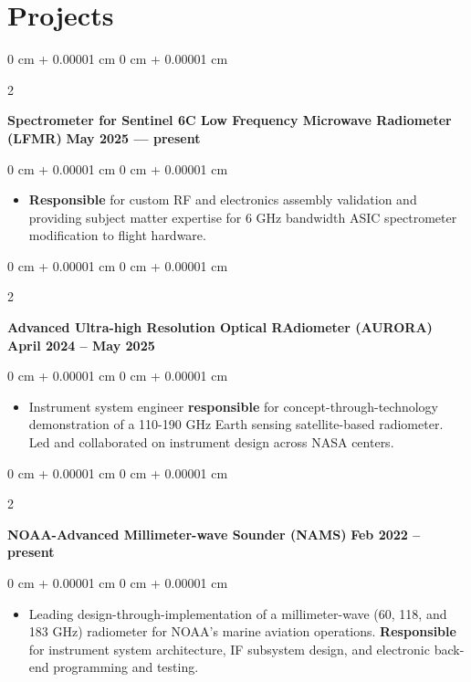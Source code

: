 \documentclass[10pt, letterpaper]{article}
\newenvironment{highlights}{
    \begin{itemize}[
        topsep=0.10 cm,
        parsep=0.10 cm,
        partopsep=0pt,
        itemsep=0pt,
        leftmargin=0 cm + 10pt     
    ]
}{
    \end{itemize}
} %
\newenvironment{onecolentry}{
    \begin{adjustwidth}{
        0 cm + 0.00001 cm
    }{
        0 cm + 0.00001 cm
    }
}{
    \end{adjustwidth}
} %
\newenvironment{twocolentry}[2][]{
    \onecolentry
    \def\secondColumn{#2}
    \setcolumnwidth{\fill, 4.5 cm}
    \begin{paracol}{2}
}{
    \switchcolumn \raggedleft \secondColumn
    \end{paracol}
    \endonecolentry
} %
\begin{document}
    \section{Projects}
       \justifying
        \begin{twocolentry}{
            \textbf{May 2025 --- present}
        }
            \textbf{Spectrometer for Sentinel 6C Low Frequency Microwave Radiometer (LFMR)}\end{twocolentry}

        \vspace{0.20 cm}
        \begin{onecolentry}
            \begin{highlights}
                \item \textbf{Responsible} for custom RF and electronics assembly validation and providing subject matter expertise for 6 GHz bandwidth ASIC spectrometer modification to flight hardware.\\
            \end{highlights}
        \end{onecolentry}
        
        \begin{twocolentry}{
            \textbf{April 2024 -- May 2025}
        }
            \textbf{Advanced Ultra-high Resolution Optical RAdiometer (AURORA)}\end{twocolentry}

        \vspace{0.20 cm}
        \begin{onecolentry}
            \begin{highlights}
                \item Instrument system engineer \textbf{responsible} for concept-through-technology demonstration of a 110-190 GHz Earth sensing satellite-based radiometer. Led and collaborated on instrument design across NASA centers.\\
            \end{highlights}
        \end{onecolentry}
        \begin{twocolentry}{
            \textbf{Feb 2022 -- present}
        }
            \textbf{NOAA-Advanced Millimeter-wave Sounder (NAMS)}\end{twocolentry}

        \vspace{0.20 cm}
        \begin{onecolentry}
            \begin{highlights}
                \item Leading design-through-implementation  of a millimeter-wave (60, 118, and 183 GHz) radiometer for NOAA's marine aviation operations. \textbf{Responsible} for instrument system architecture, IF subsystem design, and electronic back-end programming and testing.
            \end{highlights}
        \end{onecolentry}
        \vspace{0.3 cm}
\end{document}
